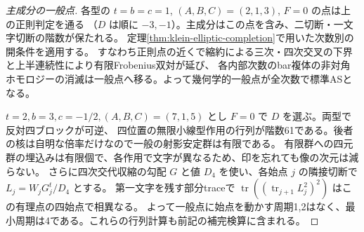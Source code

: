 \begin{proof}[主成分の一般点]
各型の $t=b=c=1$, $(A,B,C)=(2,1,3)$, $F=0$ の点は上の正則判定を通る
（$D$ は順に $-3,-1$）。主成分はこの点を含み、二切断・一文字切断の階数が保たれる。
定理\ref{thm:klein-elliptic-completion}で用いた次数別の開条件を適用する。
すなわち正則点の近くで縮約による三次・四次交叉の下界と上半連続性により有限Frobenius双対が延び、
各内部次数のbar複体の非対角ホモロジーの消滅は一般点へ移る。よって幾何学的一般点が全次数で標準ASとなる。

$t=2,b=3,c=-1/2,(A,B,C)=(7,1,5)$ とし $F=0$ で $D$ を選ぶ。両型で反対四ブロックが可逆、
四位置の無限小線型作用の行列が階数61である。後者の核は自明な倍率だけなので一般の射影安定群は有限である。
有限群への四元群の埋込みは有限個で、各作用で文字が異なるため、印を忘れても像の次元は減らない。
さらに四次交代収縮の勾配 $G$ と値 $D_4$ を使い、各始点 $j$ の隣接切断で $L_j=W_jG_j^t/D_4$ とする。
第一文字を残す部分traceで $\operatorname{tr}((\operatorname{tr}_{j+1} L_j^2)^2)$ はこの有理点の四始点で相異なる。
よって一般点に始点を動かす周期1,2はなく、最小周期は4である。これらの行列計算も前記の補完検算に含まれる。
\end{proof}
